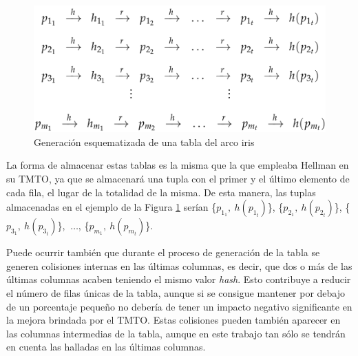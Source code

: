 \documentclass[12pt,spanish,listoffigures,listoftables,listofalgorithms]{tfgetsinf}
\newcommand{\hash}{\textit{hash}}
\begin{document}

\begin{figure}[H]
	\centering
	\includegraphics[scale = 0.25]{tabla_rainbow_2}
	\caption{Generación esquematizada de una tabla del arco iris}
	\label{tabla_rainbow_gen}
\end{figure}

La forma de almacenar estas tablas es la misma que la que empleaba Hellman en su TMTO, ya que se almacenará una tupla con el primer y el último elemento de cada fila, el lugar de la totalidad de la misma. De esta manera, las tuplas almacenadas en el ejemplo de la Figura \ref{tabla_rainbow_gen} serían \{$p_{1_1},~h(p_{1_t})$\}, \{$p_{2_1},~h(p_{2_t})$\}, \{$p_{3_1},~h(p_{3_t})$\}, $~\dots$, \{$p_{m_1},~h(p_{m_t})$\}.

Puede ocurrir también que durante el proceso de generación de la tabla se generen colisiones internas en las últimas columnas, es decir, que dos o más de las últimas columnas acaben teniendo el mismo valor \hash. Esto contribuye a reducir el número de filas únicas de la tabla, aunque si se consigue mantener por debajo de un porcentaje pequeño no debería de tener un impacto negativo significante en la mejora brindada por el TMTO. Estas colisiones pueden también aparecer en las columnas intermedias de la tabla, aunque en este trabajo tan sólo se tendrán en cuenta las halladas en las últimas columnas.
\end{document}
